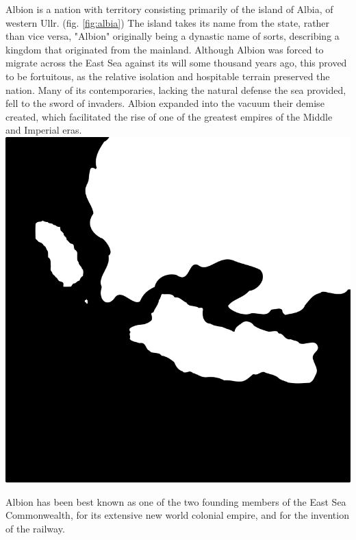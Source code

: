 

	Albion is a nation with territory consisting primarily of the island of Albia, of western Ullr. (fig. \ref{fig:albia})  The island takes its name from the state, rather than vice versa, "Albion" originally being a dynastic name of sorts, describing a kingdom that originated from the mainland.  Although Albion was forced to migrate across the East Sea against its will some thousand years ago, this proved to be fortuitous, as the relative isolation and hospitable terrain preserved the nation.  Many of its contemporaries, lacking the natural defense the sea provided, fell to the sword of invaders.  Albion expanded into the vacuum their demise created, which facilitated the rise of one of the greatest empires of the Middle and Imperial eras.\smallskip \\ 
	\includegraphics[width=\linewidth]{albia}
	\label{fig:albia}

	\smallskip

	Albion has been best known as one of the two founding members of the East Sea Commonwealth, for its extensive new world colonial empire, and for the invention of the railway.
	
